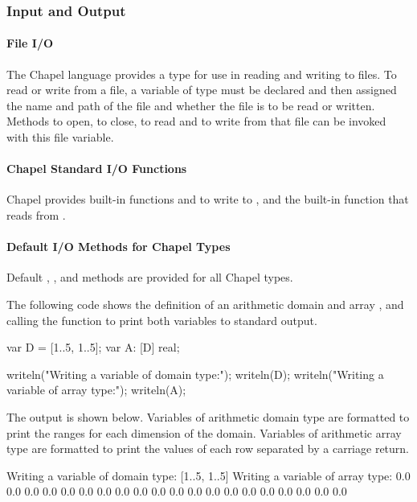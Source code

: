 \subsubsection{Input and Output}
\paragraph{File I/O}
The Chapel language provides a  type for use in reading and
writing to files.  To read or write from a file, a variable of 
type must be declared and then assigned the name and path of the file 
and whether the file is to be read or written.  Methods to open, to close,
to read and to write from that file can be invoked with this file
variable.

\paragraph{Chapel Standard I/O Functions}
Chapel provides built-in functions  and 
to write to , and the built-in function 
that reads from .

\paragraph{Default I/O Methods for Chapel Types}
Default , , and  methods are 
provided for all Chapel types.  

\begin{example}
The following code shows the definition of an arithmetic domain 
and array , and calling the  function
to print both variables to standard output.  
\begin{chapel}
var D = [1..5, 1..5];
var A: [D] real;

writeln("Writing a variable of domain type:");
writeln(D);
writeln("Writing a variable of array type:");
writeln(A);
\end{chapel}

The output is shown below.  Variables of arithmetic domain type are 
formatted to print the ranges for each dimension of the domain.  Variables
of arithmetic array type are formatted to print the values of each row
separated by a carriage return.
\begin{commandline}
Writing a variable of domain type:
[1..5, 1..5]
Writing a variable of array type:
0.0 0.0 0.0 0.0 0.0
0.0 0.0 0.0 0.0 0.0
0.0 0.0 0.0 0.0 0.0
0.0 0.0 0.0 0.0 0.0
\end{commandline}
\end{example}

